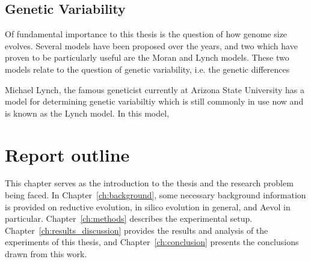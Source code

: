 \subsection{Genetic Variability}
Of fundamental importance to this thesis is the question of how genome size evolves. Several models have been proposed over the years, and two which have proven to be particularly useful are the Moran and Lynch models. These two models relate to the question of genetic variability, i.e. the genetic differences  

Michael Lynch, the famous geneticist currently at Arizona State University has a model for determining genetic variabiltiy which is still commonly in use now and is known as the Lynch model. In this model, 

\section*{Report outline}
This chapter serves as the introduction to the thesis and the research problem being faced. In Chapter~\ref{ch:background}, some necessary background information is provided on reductive evolution, in silico evolution in general, and Aevol in particular. Chapter~\ref{ch:methods} describes the experimental setup. Chapter~\ref{ch:results_discussion}
provides the results and analysis of the experiments of this thesis, and Chapter~\ref{ch:conclusion} presents the conclusions drawn from this work. 


